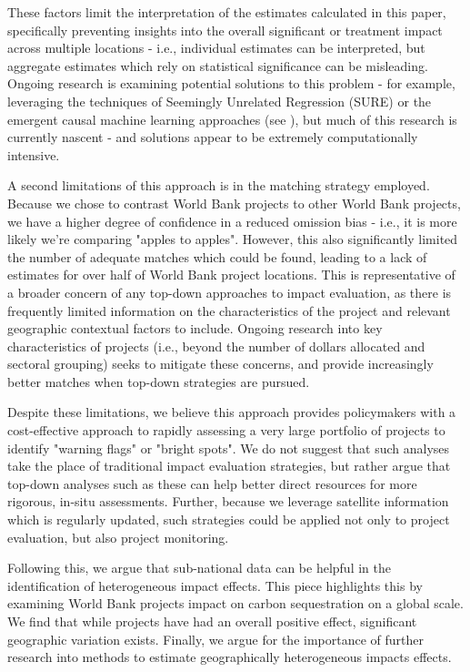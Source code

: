 \documentclass{article}\usepackage[]{graphicx}\usepackage[]{color}
\newenvironment{knitrout}{}{}  %
\begin{document}
\begin{knitrout}
These factors limit the interpretation of the estimates calculated in this paper, specifically preventing insights into the overall significant or treatment impact across multiple locations - i.e., individual estimates can be interpreted, but aggregate estimates which rely on statistical significance can be misleading.
Ongoing research is examining potential solutions to this problem - for example, leveraging the techniques of Seemingly Unrelated Regression (SURE) or the emergent causal machine learning approaches (see \cite{athey_recursive_2015}), but much of this research is currently nascent - and solutions appear to be extremely computationally intensive.
\par
A second limitations of this approach is in the matching strategy employed.
Because we chose to contrast World Bank projects to other World Bank projects, we have a higher degree of confidence in a reduced omission bias - i.e., it is more likely we're comparing "apples to apples".
However, this also significantly limited the number of adequate matches which could be found, leading to a lack of estimates for over half of World Bank project locations.
This is representative of a broader concern of any top-down approaches to impact evaluation, as there is frequently limited information on the characteristics of the project and relevant geographic contextual factors to include.
Ongoing research into key characteristics of projects (i.e., beyond the number of dollars allocated and sectoral grouping) seeks to mitigate these concerns, and provide increasingly better matches when top-down strategies are pursued.
\par
Despite these limitations, we believe this approach provides policymakers with a cost-effective approach to rapidly assessing a very large portfolio of projects to identify "warning flags" or "bright spots".  
We do not suggest that such analyses take the place of traditional impact evaluation strategies, but rather argue that top-down analyses such as these can help better direct resources for more rigorous, in-situ assessments.
Further, because we leverage satellite information which is regularly updated, such strategies could be applied not only to project evaluation, but also project monitoring.
\par
Following this, we argue that sub-national data can be helpful in the identification of  heterogeneous impact effects. 
This piece highlights this by examining World Bank projects impact on carbon sequestration on a global scale.  
We find that while projects have had an overall positive effect, significant geographic variation exists.
Finally, we argue for the importance of further research into methods to estimate geographically heterogeneous impacts effects.
\newpage


\end{knitrout}
\end{document}
